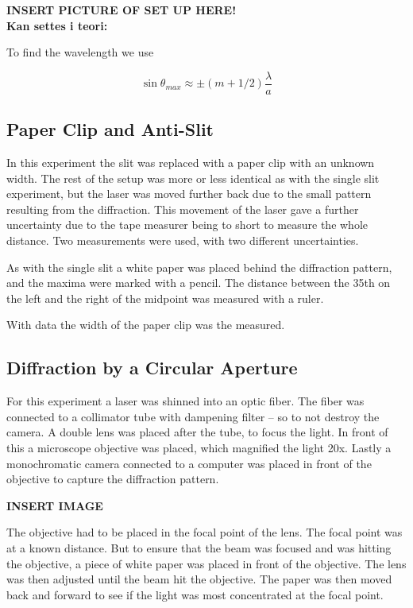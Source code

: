 \documentclass{emulateapj}
\begin{document}
\textbf{INSERT PICTURE OF SET UP HERE!}\\

\textbf{Kan settes i teori:}

To find the wavelength we use 

\begin{equation}
\sin \theta_{max} \approx \pm (m+1/2)\frac{\lambda}{a}
\end{equation}

\subsection{Paper Clip and Anti-Slit}
In this experiment the slit was replaced with a paper clip with an unknown width. The rest of the setup was more or less identical as with the single slit experiment, but the laser was moved further back due to the small pattern resulting from the diffraction. This movement of the laser gave a further uncertainty due to the tape measurer being to short to measure the whole distance. Two measurements were used, with two different uncertainties.

As with the single slit a white paper was placed behind the diffraction pattern, and the maxima were marked with a pencil. The distance between the 35th on the left and the right of the midpoint was measured with a ruler.

With data the width of the paper clip was the measured.

\subsection{Diffraction by a Circular Aperture}
For this experiment a laser was shinned into an optic fiber. The fiber was connected to a collimator tube with dampening filter -- so to not destroy the camera. A double lens was placed after the tube, to focus the light. In front of this a microscope objective was placed, which magnified the light 20x. Lastly a monochromatic camera connected to a computer was placed in front of the objective to capture the diffraction pattern.

\textbf{INSERT IMAGE}

The objective had to be placed in the focal point of the lens. The focal point was at a known distance. But to ensure that the beam was focused and was hitting the objective, a piece of white paper was placed in front of the objective. The lens was then adjusted until the beam hit the objective. The paper was then moved back and forward to see if the light was most concentrated at the focal point. 
\end{document}
